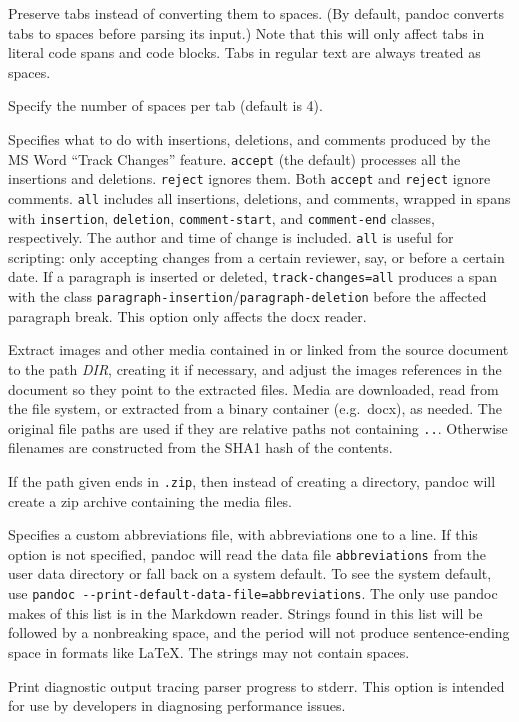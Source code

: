 \documentclass[
]{article}
\begin{document}
\begin{description}
Preserve tabs instead of converting them to spaces. (By default, pandoc
converts tabs to spaces before parsing its input.) Note that this will
only affect tabs in literal code spans and code blocks. Tabs in regular
text are always treated as spaces.
\item[\texttt{-\/-tab-stop=}\emph{NUMBER}]
Specify the number of spaces per tab (default is 4).
\item[\texttt{-\/-track-changes=accept}\textbar{}\texttt{reject}\textbar{}\texttt{all}]
Specifies what to do with insertions, deletions, and comments produced
by the MS Word ``Track Changes'' feature. \texttt{accept} (the default)
processes all the insertions and deletions. \texttt{reject} ignores
them. Both \texttt{accept} and \texttt{reject} ignore comments.
\texttt{all} includes all insertions, deletions, and comments, wrapped
in spans with \texttt{insertion}, \texttt{deletion},
\texttt{comment-start}, and \texttt{comment-end} classes, respectively.
The author and time of change is included. \texttt{all} is useful for
scripting: only accepting changes from a certain reviewer, say, or
before a certain date. If a paragraph is inserted or deleted,
\texttt{track-changes=all} produces a span with the class
\texttt{paragraph-insertion}/\texttt{paragraph-deletion} before the
affected paragraph break. This option only affects the docx reader.
\item[\texttt{-\/-extract-media=}\emph{DIR}\textbar{}\emph{FILE}\texttt{.zip}]
Extract images and other media contained in or linked from the source
document to the path \emph{DIR}, creating it if necessary, and adjust
the images references in the document so they point to the extracted
files. Media are downloaded, read from the file system, or extracted
from a binary container (e.g.~docx), as needed. The original file paths
are used if they are relative paths not containing \texttt{..}.
Otherwise filenames are constructed from the SHA1 hash of the contents.

If the path given ends in \texttt{.zip}, then instead of creating a
directory, pandoc will create a zip archive containing the media files.
\item[\texttt{-\/-abbreviations=}\emph{FILE}]
Specifies a custom abbreviations file, with abbreviations one to a line.
If this option is not specified, pandoc will read the data file
\texttt{abbreviations} from the user data directory or fall back on a
system default. To see the system default, use
\texttt{pandoc\ -\/-print-default-data-file=abbreviations}. The only use
pandoc makes of this list is in the Markdown reader. Strings found in
this list will be followed by a nonbreaking space, and the period will
not produce sentence-ending space in formats like LaTeX. The strings may
not contain spaces.
\item[\texttt{-\/-trace{[}=true\textbar{}false{]}}]
Print diagnostic output tracing parser progress to stderr. This option
is intended for use by developers in diagnosing performance issues.
\end{description}
\end{document}
